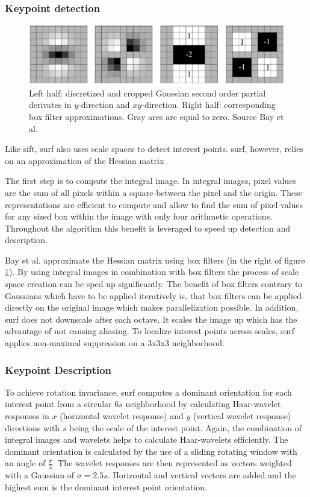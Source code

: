 \subsubsection*{Keypoint detection}
\begin{figure}[ht]
	\centering
	\includegraphics[scale=0.2]{figures/theorySURF_boxFilters}
	\caption{Left half: discretized and cropped Gaussian second order partial derivates in $y$-direction and $xy$-direction. Right half: corresponding box filter approximations. Gray ares are equal to zero. Source Bay et al. \cite{Bay2008}}
	\label{fig:surfBoxFilters}
\end{figure}
Like \gls{sift}, \gls{surf} also uses scale spaces to detect interest points. \gls{surf}, however, relies on an approximation of the Hessian matrix

The first step is to compute the integral image. In integral images, pixel values are the sum of all pixels within a square between the pixel and the origin. These representations are efficient to compute and allow to find the sum of pixel values for any sized box within the image with only four arithmetic operations. Throughout the algorithm this benefit is leveraged to speed up detection and description.

Bay et al. approximate the Hessian matrix using box filters {(in the right of figure \ref{fig:surfBoxFilters})}. By using integral images in combination with box filters the process of scale space creation can be sped up significantly. The benefit of box filters contrary to Gaussians which have to be applied iteratively is, that box filters can be applied directly on the original image which makes parallelization possible. In addition, \gls{surf} does not downscale after each octave. It scales the image up which has the advantage of not causing aliasing. To localize interest points across scales, \gls{surf} applies non-maximal suppression on a 3x3x3 neighborhood. 

\subsubsection*{Keypoint Description}
To achieve rotation invariance, \gls{surf} computes a dominant orientation for each interest point from a circular 6$s$ neighborhood by calculating Haar-wavelet responses in $x$ {(horizontal wavelet response)} and $y$ {(vertical wavelet response)} directions with $s$ being the scale of the interest point. Again, the combination of integral images and wavelets helps to calculate Haar-wavelets efficiently. The dominant orientation is calculated by the use of a sliding rotating window with an angle of $\frac{\pi}{3}$. The wavelet responses are then represented as vectors weighted with a Gaussian of $\sigma=2.5s$. Horizontal and vertical vectors are added and the highest sum is the dominant interest point orientation.

